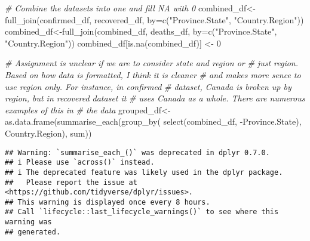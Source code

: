 \documentclass[
]{article}
\newenvironment{Shaded}{\begin{snugshade}}{\end{snugshade}}
\newcommand{\AttributeTok}[1]{\textcolor[rgb]{0.77,0.63,0.00}{#1}}
\newcommand{\CommentTok}[1]{\textcolor[rgb]{0.56,0.35,0.01}{\textit{#1}}}
\newcommand{\DecValTok}[1]{\textcolor[rgb]{0.00,0.00,0.81}{#1}}
\newcommand{\FunctionTok}[1]{\textcolor[rgb]{0.00,0.00,0.00}{#1}}
\newcommand{\NormalTok}[1]{#1}
\newcommand{\OtherTok}[1]{\textcolor[rgb]{0.56,0.35,0.01}{#1}}
\newcommand{\SpecialCharTok}[1]{\textcolor[rgb]{0.00,0.00,0.00}{#1}}
\newcommand{\StringTok}[1]{\textcolor[rgb]{0.31,0.60,0.02}{#1}}
\begin{document}
\begin{Shaded}
\begin{Highlighting}[]
\CommentTok{\# Combine the datasets into one and fill NA with 0}
\NormalTok{combined\_df}\OtherTok{\textless{}{-}}\FunctionTok{full\_join}\NormalTok{(confirmed\_df, recovered\_df, }
                       \AttributeTok{by=}\FunctionTok{c}\NormalTok{(}\StringTok{"Province.State"}\NormalTok{, }\StringTok{"Country.Region"}\NormalTok{))}
\NormalTok{combined\_df}\OtherTok{\textless{}{-}}\FunctionTok{full\_join}\NormalTok{(combined\_df, deaths\_df, }
                       \AttributeTok{by=}\FunctionTok{c}\NormalTok{(}\StringTok{"Province.State"}\NormalTok{, }\StringTok{"Country.Region"}\NormalTok{))}
\NormalTok{combined\_df[}\FunctionTok{is.na}\NormalTok{(combined\_df)] }\OtherTok{\textless{}{-}} \DecValTok{0}

\CommentTok{\# Assignment is unclear if we are to consider state and region or }
\CommentTok{\# just region. Based on how data is formatted, I think it is cleaner }
\CommentTok{\# and makes more sence to use region only.  For instance, in confirmed }
\CommentTok{\# dataset, Canada is broken up by region, but in recovered dataset it }
\CommentTok{\# uses Canada as a whole.  There are numerous examples of this in}
\CommentTok{\# the data}
\NormalTok{grouped\_df}\OtherTok{\textless{}{-}}\FunctionTok{as.data.frame}\NormalTok{(}\FunctionTok{summarise\_each}\NormalTok{(}\FunctionTok{group\_by}\NormalTok{(}
  \FunctionTok{select}\NormalTok{(combined\_df, }\SpecialCharTok{{-}}\NormalTok{Province.State), Country.Region), sum))}
\end{Highlighting}
\end{Shaded}

\begin{verbatim}
## Warning: `summarise_each_()` was deprecated in dplyr 0.7.0.
## i Please use `across()` instead.
## i The deprecated feature was likely used in the dplyr package.
##   Please report the issue at <https://github.com/tidyverse/dplyr/issues>.
## This warning is displayed once every 8 hours.
## Call `lifecycle::last_lifecycle_warnings()` to see where this warning was
## generated.
\end{verbatim}

\begin{Shaded}
\end{Shaded}
\end{document}
